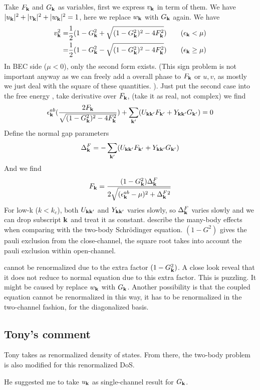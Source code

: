 Take $F_{\mathbf{k}}$ and $G_{\mathbf{k}}$ as variables, first we express $v_{\mathbf{k}}$ in term of them.  We have  $\lvert{u_{\ensuremath{\mathbf{k}}}}\rvert^2+\lvert{v_{\ensuremath{\mathbf{k}}}}\rvert^2+\lvert{w_{\ensuremath{\mathbf{k}}}}\rvert^2=1$, here we replace  $w_{\mathbf{k}}$  with  $G_{\mathbf{k}}$  again.  We have 
\[
\begin{split}
v_{\mathbf{k}}^2=&\frac{1}{2}(1-G_{\mathbf{k}}^{2}+\sqrt{(1-G_{\mathbf{k}}^{2})^{2}-4F_{\mathbf{k}}^{2}})\qquad (\epsilon_{\mathbf{k}}<\mu)\\
	=&\frac{1}{2}(1-G_{\mathbf{k}}^{2}-\sqrt{(1-G_{\mathbf{k}}^{2})^{2}-4F_{\mathbf{k}}^{2}})\qquad (\epsilon_{\mathbf{k}}\geq\mu)
\end{split}
\]
In BEC side ($\mu<0$), only the second form exists. (This sign problem is not important anyway as we can freely add a overall phase to $F_{\mathbf{k}}$ or $u,v$, as mostly we just deal with the square of these quantities. ).   Just put the second case into the free energy , take derivative over $F_{\mathbf{k}}$, (take it as real, not complex) we find 
\begin{equation}\label{eq:20100909:fEq}
\epsilon^{ab}_{\mathbf{k}}(\frac{2F_{\mathbf{k}}}{\sqrt{(1-G_{\mathbf{k}}^{2})^{2}-4F_{\mathbf{k}}^{2}}})+\sum_{\mathbf{k}'}(U_{\mathbf{k}\mathbf{k}'}F_{\mathbf{k}'}+Y_{\mathbf{k}\mathbf{k}'}G_{\mathbf{k}'})=0
\end{equation}
Define the normal gap parameters 
\begin{equation}\label{eq:20100909:gap}
\Delta^{F}_{\mathbf{k}}=-\sum_{\mathbf{k}'}(U_{\mathbf{k}\mathbf{k}'}F_{\mathbf{k}'}+Y_{\mathbf{k}\mathbf{k}'}G_{\mathbf{k}'})
\end{equation}
And we find
\begin{equation}
F_{\mathbf{k}}=\frac{(1-G_{\mathbf{k}}^{2})\Delta^{F}_{\mathbf{k}}}{2\sqrt{(\epsilon^{ab}_{\mathbf{k}}-\mu)^{2}+\Delta^{F}_{\mathbf{k}}{}^{2}}}
\end{equation}
For low-k ($k<k_{c}$), both $U_{\mathbf{k}\mathbf{k}'}$ and $Y_{\mathbf{k}\mathbf{k}'}$ varies slowly, so $\Delta^{F}_{\mathbf{k}}$ varies slowly and we can drop subscript $\mathbf{k}$ and treat it as constant.   describe the many-body effects when comparing with the two-body Schr\"{o}dinger equation.  $(1-G^{2})$ gives the pauli exclusion from the close-channel, the square root takes into account the pauli exclusion within open-channel.  

 cannot be renormalized due to the extra factor $(1-G_{\mathbf{k}}^{2})$.  A close look reveal that it does not reduce to normal \sch equation due to this extra factor.  This is puzzling.  It might be caused by replace $w_{\mathbf{k}}$ with $G_{\mathbf{k}}$.  Another possibility is that the coupled equation cannot be renormalized in this way, it has to be renormalized in the two-channel fashion, for the diagonalized  basis.  

\subsection{Tony's comment}
Tony takes  as renormalized density of states.  From there, the two-body problem is also modified for this renormalized DoS. 

He suggested me to take $u_{\mathbf{k}}$ as single-channel result for $G_{\mathbf{k}}$.   